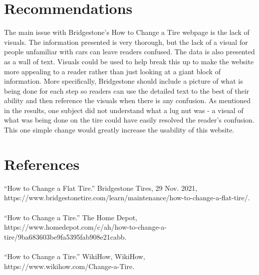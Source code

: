 \documentclass[12pt,A4paper]{article}
\begin{document}
	\section{Recommendations}
	The main issue with Bridgestone’s How to Change a Tire webpage is the lack of visuals. The information presented is very thorough, but the lack of a visual for people unfamiliar with cars can leave readers confused. The data is also presented as a wall of text. Visuals could be used to help break this up to make the website more appealing to a reader rather than just looking at a giant block of information. More specifically, Bridgestone should include a picture of what is being done for each step so readers can use the detailed text to the best of their ability and then reference the visuals when there is any confusion. As mentioned in the results, one subject did not understand what a lug nut was - a visual of what was being done on the tire could have easily resolved the reader's confusion. This one simple change would greatly increase the usability of this website.

	\section{References}
	\sloppy
	“How to Change a Flat Tire.” Bridgestone Tires, 29 Nov. 2021, https://www.bridgestonetire.com/learn/maintenance/how-to-change-a-flat-tire/.\\ \\
	“How to Change a Tire.” The Home Depot, https://www.homedepot.com/c/ah/how-to-change-a-tire/9ba683603be9fa5395fab908e21cabb.\\ \\
	“How to Change a Tire.” WikiHow, WikiHow, https://www.wikihow.com/Change-a-Tire.\\
	
	
\end{document}
